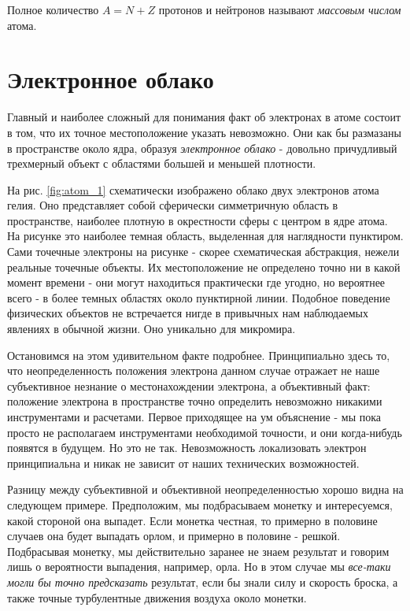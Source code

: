 Полное количество $A = N + Z$ протонов и нейтронов называют \textit{массовым числом} атома.


\section*{Электронное облако}

Главный и наиболее сложный для понимания факт об электронах в атоме состоит в том, что их точное местоположение указать невозможно.
Они как бы размазаны в пространстве около ядра, образуя \textit{электронное облако} - довольно причудливый трехмерный объект с областями большей и меньшей плотности.

На рис. \ref{fig:atom_1} схематически изображено облако двух электронов атома гелия.
Оно представляет собой сферически симметричную область в пространстве, наиболее плотную в окрестности сферы с центром в ядре атома.
На рисунке это наиболее темная область, выделенная для наглядности пунктиром.
Сами точечные электроны на рисунке - скорее схематическая абстракция, нежели реальные точечные объекты.
Их местоположение не определено точно ни в какой момент времени - они могут находиться практически где угодно, но вероятнее всего - в более темных областях около пунктирной линии.
Подобное поведение физических объектов не встречается нигде в привычных нам наблюдаемых явлениях в обычной жизни.
Оно уникально для микромира. 

Остановимся на этом удивительном факте подробнее.
Принципиально здесь то, что неопределенность положения электрона данном случае отражает не наше субъективное незнание о местонахождении электрона, а объективный факт: положение электрона в пространстве точно определить невозможно никакими инструментами и расчетами.
Первое приходящее на ум объяснение - мы пока просто не располагаем инструментами необходимой точности, и они когда-нибудь появятся в будущем.
Но это не так.
Невозможность локализовать электрон принципиальна и никак не зависит от наших технических возможностей.

Разницу между субъективной и объективной неопределенностью хорошо видна на следующем примере.
Предположим, мы подбрасываем монетку и интересуемся, какой стороной она выпадет.
Если монетка честная, то примерно в половине случаев она будет выпадать орлом, и примерно в половине - решкой.
Подбрасывая монетку, мы действительно заранее не знаем результат и говорим лишь о вероятности выпадения, например, орла.
Но в этом случае мы \textit{все-таки могли бы точно предсказать} результат, если бы знали силу и скорость броска, а также точные турбулентные движения воздуха около монетки.

